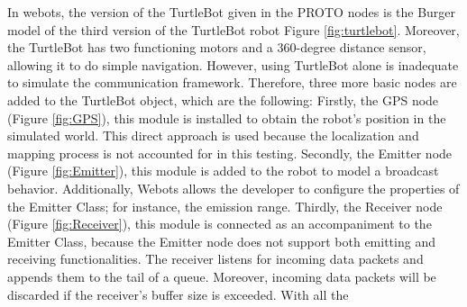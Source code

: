 In webots, the version of the TurtleBot given in the PROTO nodes is the Burger model of the third version of the TurtleBot robot Figure \ref{fig:turtlebot}.  Moreover, the TurtleBot has two functioning motors and a 360-degree distance sensor, allowing it to do simple navigation. However, using TurtleBot alone is inadequate to simulate the communication framework. Therefore, three more basic nodes are added to the TurtleBot object, which are the following: Firstly, the GPS node (Figure \ref{fig:GPS}), this module is installed to obtain the robot's position in the simulated world. This direct approach is used because the localization and mapping process is not accounted for in this testing. Secondly, the Emitter node (Figure \ref{fig:Emitter}), this module is added to the robot to model a broadcast behavior. Additionally, Webots allows the developer to configure the properties of the Emitter Class; for instance, the emission range. Thirdly, the Receiver node (Figure \ref{fig:Receiver}), this module is connected as an accompaniment to the Emitter Class, because the Emitter node does not support both emitting and receiving functionalities. The receiver listens for incoming data packets and appends them to the tail of a queue. Moreover, incoming data packets will be discarded if the receiver's buffer size is exceeded. With all the

